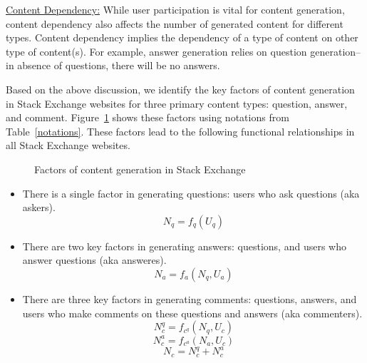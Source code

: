 \uline{Content Dependency:} While user participation is vital for content generation, content dependency also affects the number of generated content for different types. Content dependency implies the dependency of a type of content on other type of content(s). For example, answer generation relies on question generation-- in absence of questions, there will be no answers. %

Based on the above discussion, we identify the key factors of content generation in Stack Exchange websites for three primary content types: question, answer, and comment. Figure~\ref{content_factors} shows these factors using notations from Table~\ref{notations}. These factors lead to the following functional relationships in all Stack Exchange websites.

\begin{figure}[hbt]
  \centering
  \caption{Factors of content generation in Stack Exchange}
  \label{content_factors}
\end{figure}

\begin{itemize}
\item There is a single factor in generating questions: users who ask questions (aka askers).
\begin{equation*}
N_q = f_q(U_q)
\end{equation*}

\item There are two key factors in generating answers: questions, and users who answer questions (aka answeres). 
\begin{equation*}
N_a = f_a(N_q, U_a)
\end{equation*}

\item There are three key factors in generating comments: questions, answers, and users who make comments on these questions and answers (aka commenters). 
\begin{equation*}
N_c^q = f_{c^q}(N_q, U_c)
\end{equation*}
\begin{equation*}
N_c^a = f_{c^a}(N_a, U_c)
\end{equation*}
\begin{equation*}
N_c = N_c^q + N_c^a
\end{equation*}

\end{itemize}

